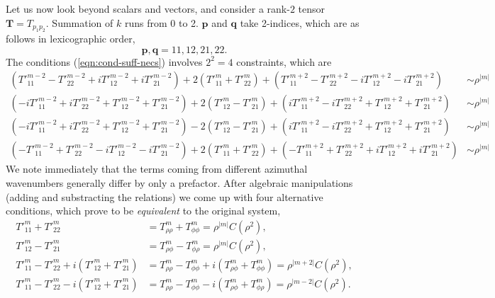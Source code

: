 \documentclass[a4paper, 11pt]{article}
\begin{document}
Let us now look beyond scalars and vectors, and consider a rank-$2$ tensor $\mathbf{T} = T_{p_1p_2}$. Summation of $k$ runs from 0 to 2. $\mathbf{p}$ and $\mathbf{q}$ take 2-indices, which are as follows in lexicographic order,
\[
    \mathbf{p},\mathbf{q} = 11, 12, 21, 22.
\]
The conditions (\ref{eqn:cond-suff-necs}) involves $2^2=4$ constraints, which are
\begin{equation}
\begin{aligned}
    \left(T'^{m-2}_{11} - T'^{m-2}_{22} + i T'^{m-2}_{12} + i T'^{m-2}_{21}\right) + 2\left(T'^m_{11} + T'^m_{22} \right)
    + \left(T'^{m+2}_{11} - T'^{m+2}_{22} - i T'^{m+2}_{12} - i T'^{m+2}_{21}\right) &\sim \rho^{|m|} \\ 
    \left(-iT'^{m-2}_{11} + iT'^{m-2}_{22} + T'^{m-2}_{12} + T'^{m-2}_{21}\right) + 2\left(T'^m_{12} - T'^m_{21} \right)
    + \left(iT'^{m+2}_{11} - iT'^{m+2}_{22} + T'^{m+2}_{12} + T'^{m+2}_{21}\right) &\sim \rho^{|m|} \\ 
    \left(-iT'^{m-2}_{11} + iT'^{m-2}_{22} + T'^{m-2}_{12} + T'^{m-2}_{21}\right) - 2\left(T'^m_{12} - T'^m_{21} \right)
    + \left(iT'^{m+2}_{11} - iT'^{m+2}_{22} + T'^{m+2}_{12} + T'^{m+2}_{21}\right) &\sim \rho^{|m|} \\ 
    \left(-T'^{m-2}_{11} + T'^{m-2}_{22} - i T'^{m-2}_{12} - i T'^{m-2}_{21}\right) + 2\left(T'^m_{11} + T'^m_{22} \right)
    + \left(- T'^{m+2}_{11} + T'^{m+2}_{22} + i T'^{m+2}_{12} + i T'^{m+2}_{21}\right) &\sim \rho^{|m|}
\end{aligned} 
\end{equation}
We note immediately that the terms coming from different azimuthal wavenumbers generally differ by only a prefactor. After algebraic manipulations (adding and substracting the relations) we come up with four alternative conditions, which prove to be \textit{equivalent} to the original system,
\begin{equation}\label{eqn:rank-2-conditions}
\begin{aligned}
    T'^m_{11} + T'^m_{22} &= T^m_{\rho\rho} + T^m_{\phi\phi} = \rho^{|m|} C(\rho^2),\\
    T'^m_{12} - T'^m_{21} &= T^m_{\rho\phi} - T^m_{\phi\rho} = \rho^{|m|} C(\rho^2),\\
    T'^m_{11} - T'^m_{22} + i \left(T'^m_{12} + T'^m_{21}\right) &= T^m_{\rho\rho} - T^m_{\phi\phi} + i \left(T^m_{\rho\phi} + T^m_{\phi\phi}\right) = \rho^{|m+2|} C(\rho^2), \\ 
    T'^m_{11} - T'^m_{22} - i \left(T'^m_{12} + T'^m_{21}\right) &= T^m_{\rho\rho} - T^m_{\phi\phi} - i \left(T^m_{\rho\phi} + T^m_{\phi\rho}\right) = \rho^{|m-2|} C(\rho^2).
\end{aligned}
\end{equation}
\end{document}
